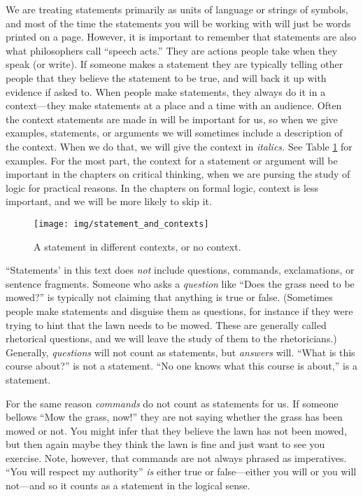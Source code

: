 We are treating statements primarily as units of language or strings of symbols, and most of the time the statements you will be working with will just be words printed on a page. However, it is important to remember that statements are also what philosophers call ``speech acts.'' They are actions people take when they speak (or write). If someone makes a statement they are typically telling other people that they believe the statement to be true, and will back it up with evidence if asked to. When people make statements, they always do it in a context---they make statements at a place and a time with an audience. Often the context statements are made in will be important for us, so when we give examples, statements, or arguments we will sometimes include a description of the context. When we do that, we will give the context in \textit{italics.} See Table \ref{table:statements_and_context} for examples. \label{context_marker} For the most part, the context for a statement or argument will be important in the chapters on critical thinking, when we are pursing the study of logic for practical reasons. In the chapters on formal logic, context is less important, and we will be more likely to skip it. 

\begin{figure}
\begin{mdframed}[style=mytableclearbox]
\texttt{[image: img/statement\_and\_contexts]}
\end{mdframed}
\caption{A statement in different contexts, or no context.} \label{table:statements_and_context}
\end{figure}


``Statements' in this text does \emph{not} include questions, commands, exclamations, or sentence fragments. Someone who asks a \emph{question} like ``Does the grass need to be mowed?'' is typically not claiming that anything is true or false. (Sometimes people make statements and disguise them as questions, for instance if they were trying to hint that the lawn needs to be mowed. These are generally called rhetorical questions, and we will leave the study of them to the rhetoricians.) Generally, \emph{questions} will not count as statements, but \emph{answers} will. ``What is this course about?'' is not a statement. ``No one knows what this course is about,'' is a statement.

For the same reason \emph{commands} do not count as statements for us. If someone bellows ``Mow the grass, now!'' they are not saying whether the grass has been mowed or not. You might infer that they believe the lawn has not been mowed, but then again maybe they think the lawn is fine and just want to see you exercise. Note, however, that commands are not always phrased as imperatives. ``You will respect my authority'' \emph{is} either true or false---either you will or you will not---and so it counts as a statement in the logical sense.

